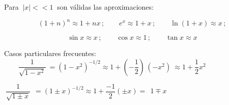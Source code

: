 \begin{cuadro-naranja}
\begin{adjustwidth}{20pt}{0pt}
\begin{itemize}
\end{itemize}

\vspace{5mm} Para $\ |x|<<1\ $ son válidas las aproximaciones:

\vspace{-8mm}
$$(1+n)^n\approx 1+nx\, ; \qquad e^x\approx 1+x\, ; \qquad \ln(1+x)\approx x\, ; $$

$$\sin x  \approx x\, ; \qquad \cos x\approx 1\, ; \qquad \tan x\approx x$$

\begin{small}
Casos particulares frecuentes: $\qquad \boxed{ \dfrac 1{\sqrt{1-x^2}}}\  = (1-x^2)^{-1/2} \approx  1+\left(- \dfrac 1 2 \right) \, (-x^2)\ \boxed{ \approx 1+\dfrac 1 2 x^2}$

\hspace{5.2cm} $\boxed{ \ \dfrac 1{\sqrt{1\pm x}} \ } \ =(1\pm x)^{-1/2}\approx 1+	\dfrac{-1}2 (\pm x)=\  \boxed{ \ 1\mp x \ }$
\end{small}


\end{adjustwidth}
\end{cuadro-naranja}
\color{black}


